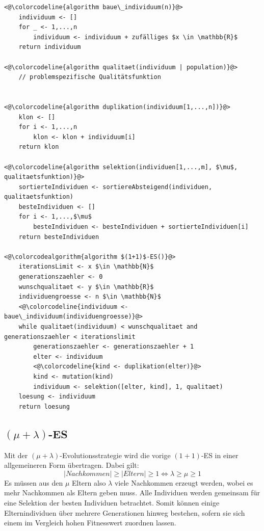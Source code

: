 \begin{lstlisting}[caption={$(1+1)$-Evolutionsstrategie}, firstnumber=1, captionpos=b, label=lst:1_und_1_es]
<@\colorcodeline{algorithm baue\_individuum(n)}@>
	individuum <- []	
	for _ <- 1,...,n
		individuum <- individuum + zufälliges $x \in \mathbb{R}$
	return individuum
	
<@\colorcodeline{algorithm qualitaet(individuum | population)}@>
	// problemspezifische Qualitätsfunktion

	
<@\colorcodeline{algorithm duplikation(individuum[1,...,n])}@>
	klon <- []
	for i <- 1,...,n
		klon <- klon + individuum[i]
	return klon
	
<@\colorcodeline{algorithm selektion(individuen[1,...,m], $\mu$, qualitaetsfunktion)}@>
	sortierteIndividuen <- sortiereAbsteigend(individuen, qualitaetsfunktion)
	besteIndividuen <- []
	for i <- 1,...,$\mu$
		besteIndividuen <- besteIndividuen + sortierteIndividuen[i]
	return besteIndividuen

<@\colorcodealgorithm{algorithm $(1+1)$-ES()}@>
	iterationsLimit <- x $\in \mathbb{N}$
	generationszaehler <- 0
	wunschqualitaet <- y $\in \mathbb{R}$
	individuengroesse <- n $\in \mathbb{N}$
	<@\colorcodeline{individuum <- baue\_individuum(individuengroesse)}@>
	while qualitaet(individuum) < wunschqualitaet and generationszaehler < iterationslimit
		generationszaehler <- generationszaehler + 1
		elter <- individuum
		<@\colorcodeline{kind <- duplikation(elter)}@>
		kind <- mutation(kind)
		individuum <- selektion([elter, kind], 1, qualitaet)
	loesung <- individuum
	return loesung
\end{lstlisting}

\subsection{$(\mu + \lambda)$-ES}

Mit der $(\mu + \lambda)$-Evolutionsstrategie wird die vorige $(1+1)$-ES in einer allgemeineren Form übertragen.
Dabei gilt:
\begin{equation}
|Nachkommen| \ge |Eltern| \ge 1 \Leftrightarrow \lambda \ge \mu \ge 1
\end{equation}
Es müssen aus den $\mu$ Eltern also $\lambda$ viele Nachkommen erzeugt werden, wobei es mehr Nachkommen als Eltern geben muss.
Alle Individuen werden gemeinsam für eine Selektion der besten Individuen betrachtet.
Somit können einige Elternindividuen über mehrere Generationen hinweg bestehen, sofern sie sich einem im Vergleich hohen Fitnesswert zuordnen lassen.

